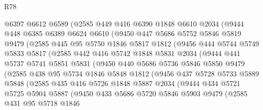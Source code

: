 \begin{lexlean}{R78}
\begin{coremodule}
        @6397
        @6612
        @6589
        (@2585
          @449
          @416
          @6390
          @1848
          @6610
          @2034
          (@9444
            @448
            @6385
            @6389
            @6624
            @6610
            (@9450
              @447
              @5686
              @5752
              @5846
              @5819
              @9479
              (@2585
                @445
                @95
                @5750
                @1846
                @5817
                @1812
                (@9456
                  @444
                  @5744
                  @5749
                  @5833
                  @5817
                  (@2585
                    @442
                    @416
                    @5742
                    @1848
                    @5831
                    @2034
                    (@9444
                      @441
                      @5737
                      @5741
                      @5851
                      @5831
                      (@9450
                        @440
                        @5686
                        @5736
                        @5846
                        @5850
                        @9479
                        (@2585
                          @438
                          @95
                          @5734
                          @1846
                          @5848
                          @1812
                          (@9456
                            @437
                            @5728
                            @5733
                            @5889
                            @5848
                            (@2585
                              @435
                              @416
                              @5726
                              @1848
                              @5887
                              @2034
                              (@9444
                                @434
                                @5721
                                @5725
                                @5904
                                @5887
                                (@9450
                                  @433
                                  @5686
                                  @5720
                                  @5846
                                  @5903
                                  @9479
                                  (@2585
                                    @431
                                    @95
                                    @5718
                                    @1846

\end{coremodule}
\end{lexlean}
